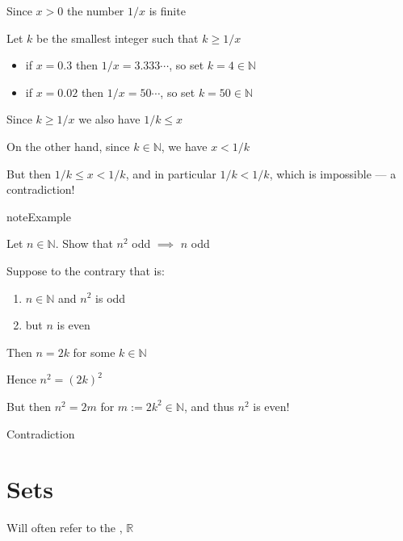 \documentclass[letterpaper,10pt,english]{jupyterBook}
\begin{document}
\sphinxAtStartPar
Since \(x > 0\) the number \(1/x\) is finite

\sphinxAtStartPar
Let \(k\) be the smallest integer such that \(k \geq 1/x\)
\begin{itemize}
\item {} 
\sphinxAtStartPar
if \(x = 0.3\) then \(1/x = 3.333\cdots\), so set \(k = 4 \in \mathbb{N}\)

\item {} 
\sphinxAtStartPar
if \(x = 0.02\) then \(1/x = 50\cdots\), so set \(k = 50 \in \mathbb{N}\)

\end{itemize}

\sphinxAtStartPar
Since \(k \geq 1/x\) we also have \(1/k \leq x\)

\sphinxAtStartPar
On the other hand, since \(k \in \mathbb{N}\), we have \(x < 1/k\)

\sphinxAtStartPar
But then \(1/k \leq x < 1/k\), and in particular \(1/k < 1/k\), which is impossible — a contradiction!

\begin{sphinxadmonition}{note}{Example}

\sphinxAtStartPar
Let \(n \in \mathbb{N}\). Show that \(n^2\) odd \(\implies\) \(n\) odd
\end{sphinxadmonition}

\sphinxAtStartPar
{} Suppose to the contrary that is:
\begin{enumerate}
%
\item {} 
\sphinxAtStartPar
\(n \in \mathbb{N}\) and \(n^2\) is odd

\item {} 
\sphinxAtStartPar
but \(n\) is even

\end{enumerate}

\sphinxAtStartPar
Then \(n = 2k\) for some \(k \in \mathbb{N}\)

\sphinxAtStartPar
Hence \(n^2 = (2k)^2\)

\sphinxAtStartPar
But then \(n^2 = 2m\) for \(m := 2k^2 \in \mathbb{N}\), and thus \(n^2\) is even!

\sphinxAtStartPar
Contradiction


\section{Sets}
\label{\detokenize{03.set_theory:sets}}
\sphinxAtStartPar
Will often refer to the ,  \(\mathbb{R}\)
\end{document}
